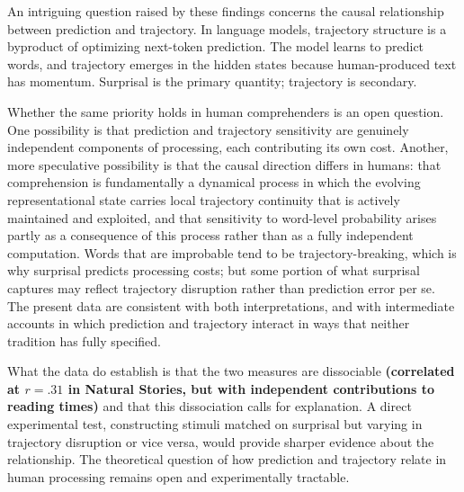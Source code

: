 \documentclass[12pt]{article}
\newcommand{\new}[1]{{\bfseries #1}}
\begin{document}
An intriguing question raised by these findings concerns the causal relationship between prediction and trajectory. In language models, trajectory structure is a byproduct of optimizing next-token prediction. The model learns to predict words, and trajectory emerges in the hidden states because human-produced text has momentum. Surprisal is the primary quantity; trajectory is secondary.

Whether the same priority holds in human comprehenders is an open question. One possibility is that prediction and trajectory sensitivity are genuinely independent components of processing, each contributing its own cost. Another, more speculative possibility is that the causal direction differs in humans: that comprehension is fundamentally a dynamical process in which the evolving representational state carries local trajectory continuity that is actively maintained and exploited, and that sensitivity to word-level probability arises partly as a consequence of this process rather than as a fully independent computation. Words that are improbable tend to be trajectory-breaking, which is why surprisal predicts processing costs; but some portion of what surprisal captures may reflect trajectory disruption rather than prediction error per se. The present data are consistent with both interpretations, and with intermediate accounts in which prediction and trajectory interact in ways that neither tradition has fully specified.

What the data do establish is that the two measures are dissociable \new{(correlated at $r = .31$ in Natural Stories, but with independent contributions to reading times)} and that this dissociation calls for explanation. A direct experimental test, constructing stimuli matched on surprisal but varying in trajectory disruption or vice versa, would provide sharper evidence about the relationship. The theoretical question of how prediction and trajectory relate in human processing remains open and experimentally tractable.
\end{document}
